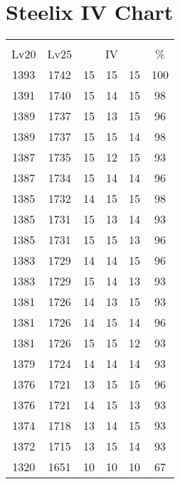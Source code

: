 \documentclass{article}%
\begin{document}
%
\normalsize%
\section{Steelix IV Chart}%
\label{sec:Steelix IV Chart}%
\renewcommand{\arraystretch}{1.5}%
\begin{tabular}{|c|c|c|c|c|c|}%
\hline%
\multicolumn{6}{|c|}{\textcolor{white}{ 
\linebreak{Steelix}
}%
\cellcolor{black}}\\%
\multicolumn{1}{|c}{Lv20}&\multicolumn{1}{c|}{Lv25}&\multicolumn{3}{c|}{IV}&\multicolumn{1}{|c|}{\%}\\%
\hline%
\rowcolor{color100}%
1393&1742&15&15&15&100\\%
\hline%
\rowcolor{color98}%
1391&1740&15&14&15&98\\%
\hline%
\rowcolor{color96}%
1389&1737&15&13&15&96\\%
\hline%
\rowcolor{color98}%
1389&1737&15&15&14&98\\%
\hline%
\rowcolor{color93}%
1387&1735&15&12&15&93\\%
\hline%
\rowcolor{color96}%
1387&1734&15&14&14&96\\%
\hline%
\rowcolor{color98}%
1385&1732&14&15&15&98\\%
\hline%
\rowcolor{color93}%
1385&1731&15&13&14&93\\%
\hline%
\rowcolor{color96}%
1385&1731&15&15&13&96\\%
\hline%
\rowcolor{color96}%
1383&1729&14&14&15&96\\%
\hline%
\rowcolor{color93}%
1383&1729&15&14&13&93\\%
\hline%
\rowcolor{color93}%
1381&1726&14&13&15&93\\%
\hline%
\rowcolor{color96}%
1381&1726&14&15&14&96\\%
\hline%
\rowcolor{color93}%
1381&1726&15&15&12&93\\%
\hline%
\rowcolor{color93}%
1379&1724&14&14&14&93\\%
\hline%
\rowcolor{color96}%
1376&1721&13&15&15&96\\%
\hline%
\rowcolor{color93}%
1376&1721&14&15&13&93\\%
\hline%
\rowcolor{color93}%
1374&1718&13&14&15&93\\%
\hline%
\rowcolor{color93}%
1372&1715&13&15&14&93\\%
\hline%
\rowcolor{color91}%
1320&1651&10&10&10&67\\%
\end{tabular}

%
\end{document}
